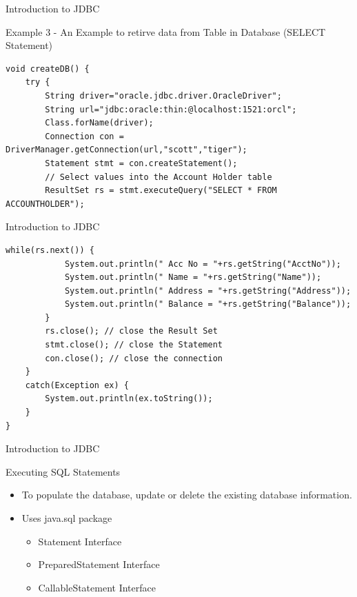 \documentclass[14pt]{beamer}
\begin{document}
\begin{frame}[fragile]{Introduction to JDBC}
\begin{block}{}
Example 3 -  An Example to retirve data from Table in Database (SELECT Statement)
\end{block}
\begin{lstlisting}[numbers=none]
void createDB() {
    try { 
        String driver="oracle.jdbc.driver.OracleDriver";
        String url="jdbc:oracle:thin:@localhost:1521:orcl";
        Class.forName(driver);
        Connection con = DriverManager.getConnection(url,"scott","tiger");
        Statement stmt = con.createStatement();
        // Select values into the Account Holder table
        ResultSet rs = stmt.executeQuery("SELECT * FROM ACCOUNTHOLDER");
\end{lstlisting}
\end{frame}
\begin{frame}[fragile]{Introduction to JDBC}
\begin{lstlisting}[numbers=none]
        while(rs.next()) {
            System.out.println(" Acc No = "+rs.getString("AcctNo"));
            System.out.println(" Name = "+rs.getString("Name"));
            System.out.println(" Address = "+rs.getString("Address"));
            System.out.println(" Balance = "+rs.getString("Balance"));
        }
        rs.close(); // close the Result Set
        stmt.close(); // close the Statement
        con.close(); // close the connection
    }
    catch(Exception ex) {
        System.out.println(ex.toString());
    }
}
\end{lstlisting}
\end{frame}

\begin{frame}[fragile]{Introduction to JDBC}
\begin{block}{}
Executing SQL Statements
\end{block}
\begin{itemize}
\item To populate the database, update or delete the existing database information.
\item Uses java.sql package
\begin{itemize}
\item Statement Interface
\item PreparedStatement Interface
 \item CallableStatement Interface
\end{itemize}
\end{itemize}
\end{frame}
\end{document}
